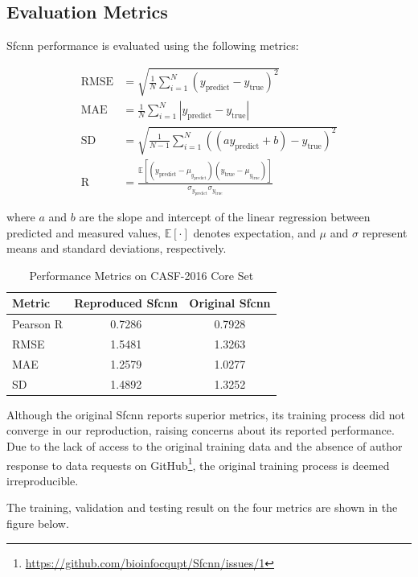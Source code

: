 \documentclass[unnumsec,webpdf,contemporary,large]{oup-authoring-template}
\theoremstyle{thmstyleone}%
\theoremstyle{thmstyletwo}%
\theoremstyle{thmstylethree}%
\begin{document}
\subsection{Evaluation Metrics}
\vspace{0.5em}
Sfcnn performance is evaluated using the following metrics:

\begin{align*}
\mathrm{RMSE} &= \sqrt{\frac{1}{N} \sum_{i=1}^{N} (y_{\text{predict}} - y_{\text{true}})^2} \\
\mathrm{MAE} &= \frac{1}{N} \sum_{i=1}^{N} |y_{\text{predict}} - y_{\text{true}}| \\
\mathrm{SD} &= \sqrt{\frac{1}{N-1} \sum_{i=1}^{N} ((a y_{\text{predict}} + b) - y_{\text{true}})^2} \\
\mathrm{R} &= \frac{\mathbb{E}[(y_{\text{predict}} - \mu_{y_{\text{predict}}})(y_{\text{true}} - \mu_{y_{\text{true}}})]}{\sigma_{y_{\text{predict}}} \sigma_{y_{\text{true}}}}
\end{align*}

where $a$ and $b$ are the slope and intercept of the linear 
regression between predicted and measured values, 
$\mathbb{E}[\cdot]$ denotes expectation, 
and $\mu$ and $\sigma$ represent means and standard deviations, 
respectively.

\begin{table}[H]
\centering
\caption{Performance Metrics on CASF-2016 Core Set}
\label{tab:metrics}
\begin{tabular}{lcc}
\toprule
Metric & Reproduced Sfcnn & Original Sfcnn \\
\midrule
Pearson R & 0.7286 & 0.7928 \\
RMSE & 1.5481 & 1.3263 \\
MAE & 1.2579 & 1.0277 \\
SD & 1.4892 & 1.3252 \\
\bottomrule
\end{tabular}
\end{table}

Although the original Sfcnn reports superior metrics, 
its training process did not converge in our reproduction, 
raising concerns about its reported performance. Due to the lack of access to the original training data and the absence of 
author response to data requests on GitHub\footnote{\url{https://github.com/bioinfocqupt/Sfcnn/issues/1}}, 
the original training process is deemed irreproducible.


The training, validation and testing result on the four metrics
are shown in the figure below.
\end{document}
